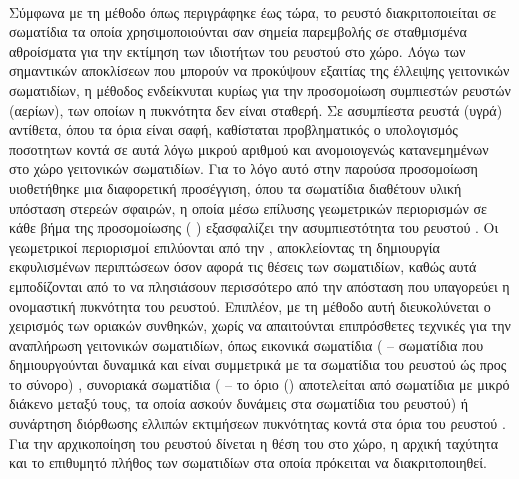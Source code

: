 \paragraph{} Σύμφωνα με τη μέθοδο  όπως περιγράφηκε έως τώρα, το ρευστό
διακριτοποιείται σε σωματίδια τα οποία χρησιμοποιούνται σαν σημεία παρεμβολής σε
σταθμισμένα αθροίσματα για την εκτίμηση των ιδιοτήτων του ρευστού στο χώρο. Λόγω των
σημαντικών αποκλίσεων που μπορούν να προκύψουν εξαιτίας της έλλειψης γειτονικών
σωματιδίων, η μέθοδος ενδείκνυται κυρίως για την προσομοίωση συμπιεστών ρευστών (αερίων),
των οποίων η πυκνότητα δεν είναι σταθερή. Σε ασυμπίεστα ρευστά (υγρά) αντίθετα, όπου τα
όρια είναι σαφή, καθίσταται προβληματικός ο υπολογισμός ποσοτητων κοντά σε αυτά λόγω
μικρού αριθμού και ανομοιογενώς κατανεμημένων στο χώρο γειτονικών σωματιδίων. Για το λόγο
αυτό στην παρούσα προσομοίωση υιοθετήθηκε μια διαφορετική προσέγγιση, όπου τα σωματίδια
διαθέτουν υλική υπόσταση στερεών σφαιρών, η οποία μέσω επίλυσης γεωμετρικών περιορισμών σε
κάθε βήμα της προσομοίωσης ( \cite{Muller2007109})
εξασφαλίζει την ασυμπιεστότητα του ρευστού \cite{macklin2013position}. Οι γεωμετρικοί
περιορισμοί επιλύονται από την , αποκλείοντας τη δημιουργία εκφυλισμένων
περιπτώσεων όσον αφορά τις θέσεις των σωματιδίων, καθώς αυτά εμποδίζονται από το να
πλησιάσουν περισσότερο από την απόσταση που υπαγορεύει η ονομαστική πυκνότητα του
ρευστού. Επιπλέον, με τη μέθοδο αυτή διευκολύνεται ο χειρισμός των οριακών συνθηκών, χωρίς
να απαιτούνται επιπρόσθετες τεχνικές για την αναπλήρωση γειτονικών σωματιδίων, όπως
εικονικά σωματίδια ( -- σωματίδια που δημιουργούνται δυναμικά και
είναι συμμετρικά με τα σωματίδια του ρευστού ώς προς το σύνορο) \cite{Colagrossi2003448},
συνοριακά σωματίδια ( -- το όριο () αποτελείται από
σωματίδια με μικρό διάκενο μεταξύ τους, τα οποία ασκούν δυνάμεις στα σωματίδια του
ρευστού) \cite{Monaghan20091811} ή συνάρτηση διόρθωσης ελλιπών εκτιμήσεων πυκνότητας κοντά
στα όρια του ρευστού \cite{Feldman2007295}. Για την αρχικοποίηση του ρευστού δίνεται η
θέση του στο χώρο, η αρχική ταχύτητα και το επιθυμητό πλήθος των σωματιδίων στα οποία
πρόκειται να διακριτοποιηθεί.

